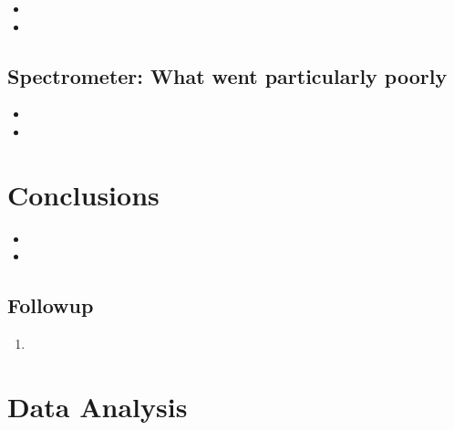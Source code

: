 \begin{itemize}
\item{}
\item{}
\end{itemize}

\subsection{Spectrometer: {\color{red} What went particularly poorly}}

\begin{itemize}
\item{}
\item{}
\end{itemize}


\section{Conclusions}

\begin{itemize}
\item{}
\item{}
\end{itemize}


\subsection{Followup}


\begin{enumerate}
\item{}
\end{enumerate}

\newpage

\section{Data Analysis}


